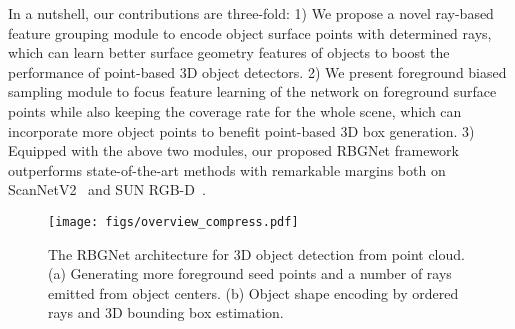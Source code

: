 \documentclass[final]{cvpr}
\begin{document}
In a nutshell, our contributions are three-fold: 
1) We propose a novel ray-based feature grouping module to encode object surface points with determined rays, which can learn better surface geometry features of objects to boost the performance of point-based 3D object detectors.
2) We present foreground biased sampling module to focus feature learning of the network on foreground surface points while also keeping the coverage rate for the whole scene, which can incorporate more object points to benefit point-based 3D box generation.
3) Equipped with the above two modules, our proposed RBGNet framework outperforms state-of-the-art methods with remarkable margins both on ScanNetV2~\cite{dai2017scannet} and SUN RGB-D~\cite{sunrgbd}.

\begin{figure*}[t]
  \centering
  \texttt{[image: figs/overview\_compress.pdf]}
  \vspace{-8pt}
   \caption{The RBGNet architecture for 3D object detection from point cloud. (a) Generating more foreground seed points and a number of rays emitted from object centers. (b) Object shape encoding by ordered rays and 3D bounding box estimation.}
   \label{fig:overview}
  \vspace{-12pt}
\end{figure*}
\end{document}
